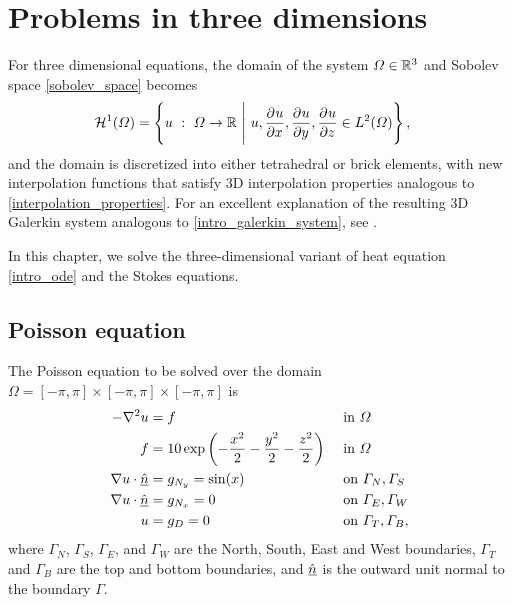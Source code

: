 
\chapter{Problems in three dimensions}

For three dimensional equations, the domain of the system $\varOmega \in \mathbb{R}^3$ and Sobolev space \cref{sobolev_space} becomes
\begin{align}
  \label{3d_sobolev_space}
  \mathcal{H}^1(\Omega) &= \left\{ u\ :\ \Omega \rightarrow \R\ \Bigg|\ u, \parder{u}{x}, \parder{u}{y}, \parder{u}{z} \in L^2(\Omega) \right\},
\end{align}
and the domain is discretized into either tetrahedral or brick elements, with new interpolation functions that satisfy 3D interpolation properties analogous to \cref{interpolation_properties}.  For an excellent explanation of the resulting 3D Galerkin system analogous to \cref{intro_galerkin_system}, see \citet{elman_2005}.

In this chapter, we solve the three-dimensional variant of heat equation \cref{intro_ode} and the Stokes equations.


\section{Poisson equation}

The Poisson equation to be solved over the domain $\Omega = [-\pi,\pi] \times [-\pi,\pi] \times [-\pi,\pi]$ is
\begin{subequations}
\label{3d_poisson}
\begin{align}
  \label{3d_poisson_start}
  -\nabla^2 u &= f &&\text{ in } \varOmega \\
  f &= 10 \exp\left( -\frac{x^2}{2} - \frac{y^2}{2} - \frac{z^2}{2}\right) &&\text{ in } \varOmega \\
  \nabla u \cdot \underline{\hat{n}} &= g_{N_y} = \sin(x) &&\text{ on } \varGamma_N, \varGamma_S \\
  \nabla u \cdot \underline{\hat{n}} &= g_{N_x} = 0 &&\text{ on } \varGamma_E, \varGamma_W \\
  \label{3d_poisson_end}
  u &= g_D = 0 &&\text{ on } \varGamma_T, \varGamma_B,
\end{align}
\end{subequations}
where $\Gamma_N$, $\Gamma_S$, $\Gamma_E$, and $\Gamma_W$ are the North, South, East and West boundaries, $\Gamma_T$ and $\Gamma_B$ are the top and bottom boundaries, and $\underline{\hat{n}}$ is the outward unit normal to the boundary $\Gamma$.

